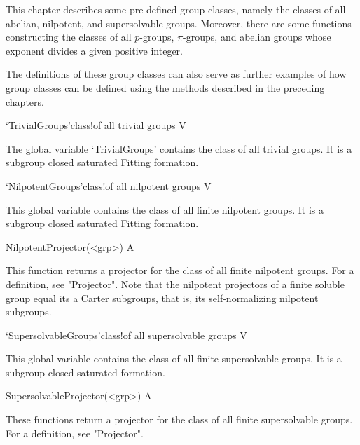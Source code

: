 
This chapter describes some pre-defined 
group classes, namely the classes of all abelian, nilpotent, and supersolvable
groups. Moreover, there are some functions constructing the classes of all
$p$-groups, $\pi$-groups, and abelian groups whose exponent divides a given
positive integer. 

The definitions of these group classes can also serve as further examples of
how group classes can be defined using the methods described in the preceding
chapters.


\>`TrivialGroups'{class}!{of all trivial groups} V

%
The global variable `TrivialGroups' contains the class of all trivial groups. It is a
subgroup closed saturated Fitting formation.

\>`NilpotentGroups'{class}!{of all nilpotent groups} V

%
This global variable contains the class of all finite nilpotent groups. It is a
subgroup closed saturated Fitting formation.

\>NilpotentProjector(<grp>) A

%
This function returns a projector for the class of all finite nilpotent
groups. For a definition, see "Projector". Note that the nilpotent projectors
of a finite soluble group equal its a Carter subgroups, that is, its
self-normalizing nilpotent subgroups. 

\>`SupersolvableGroups'{class}!{of all supersolvable groups} V

%
This global variable contains the class of all finite supersolvable groups. It
is a subgroup closed saturated formation.

\>SupersolvableProjector(<grp>) A

These functions return a projector for the class of all finite supersolvable
groups. For a definition, see "Projector". 

